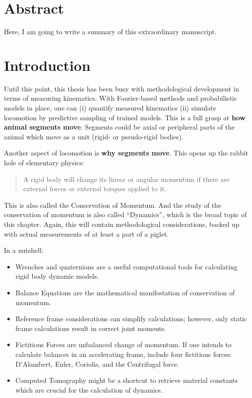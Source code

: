 \clearpage


\section{Abstract}
\label{sec:org46d1be2}
Here, I am going to write a summary of this extraordinary manuscript.

\clearpage

\section{Introduction}
\label{sec:orgd1de252}
Until this point, this thesis has been busy with methodological development in terms of measuring kinematics.
With Fourier-based methods and probabilistic models in place, one can
  (i) quantify measured kinematics
  (ii) simulate locomotion by predictive sampling of trained models.
This is a full grasp at \textbf{how animal segments move}.
Segments could be axial or peripheral parts of the animal which move as a unit (rigid- or pseudo-rigid bodies).


Another aspect of locomotion is \textbf{why segments move}.
This opens up the rabbit hole of elementary physics:
\begin{quote}
A rigid body will change its linear or angular momentum if there are external forces or external torques applied to it.
\end{quote}
This is also called the Conservation of Momentum.
And the study of the conservation of momentum is also called ``Dynamics'', which is the broad topic of this chapter.
Again, this will contain methodological considerations, backed up with actual measurements of at least a part of a piglet.

In a nutshell:
\begin{itemize}
\item Wrenches and quaternions are a useful computational tools for calculating rigid body dynamic models.
\item Balance Equations are the mathematical manifestation of conservation of momentum.
\item Reference frame considerations can simplify calculations; however, only static frame calculations result in correct joint moments.
\item Fictitious Forces are unbalanced change of momentum. If one intends to calculate balances in an accelerating frame, include four fictitious forces: D’Alambert, Euler, Coriolis, and the Centrifugal force.
\item Computed Tomography might be a shortcut to retrieve material constants which are crucial for the calculation of dynamics.
\end{itemize}


